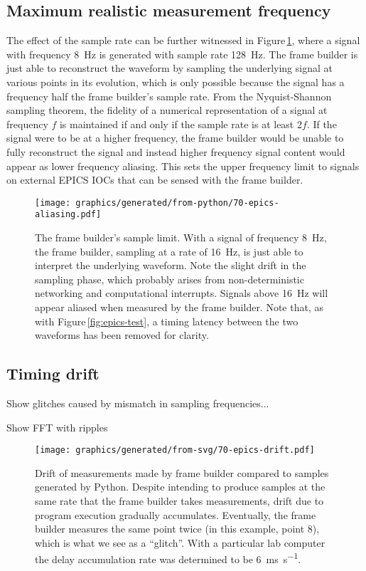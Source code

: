 \subsection{Maximum realistic measurement frequency}
The effect of the sample rate can be further witnessed in Figure\,\ref{fig:sample-aliasing}, where a signal with frequency \SI{8}{\hertz} is generated with sample rate \SI{128}{\hertz}. The frame builder is just able to reconstruct the waveform by sampling the underlying signal at various points in its evolution, which is only possible because the signal has a frequency half the frame builder's sample rate. From the Nyquist-Shannon sampling theorem, the fidelity of a numerical representation of a signal at frequency $f$ is maintained if and only if the sample rate is at least $2f$. If the signal were to be at a higher frequency, the frame builder would be unable to fully reconstruct the signal and instead higher frequency signal content would appear as lower frequency aliasing. This sets the upper frequency limit to signals on external \gls{EPICS} \glspl{IOC} that can be sensed with the frame builder.

\begin{figure}
  \centering
  \texttt{[image: graphics/generated/from-python/70-epics-aliasing.pdf]}
  \caption[Signal aliasing in the frame builder]{\label{fig:sample-aliasing}The frame builder's sample limit. With a signal of frequency \SI{8}{\hertz}, the frame builder, sampling at a rate of \SI{16}{\hertz}, is just able to interpret the underlying waveform. Note the slight drift in the sampling phase, which probably arises from non-deterministic networking and computational interrupts. Signals above \SI{16}{\hertz} will appear aliased when measured by the frame builder. Note that, as with Figure\,\ref{fig:epics-test}, a timing latency between the two waveforms has been removed for clarity.}
\end{figure}

\subsection{Timing drift}
Show glitches caused by mismatch in sampling frequencies...

Show FFT with ripples

\begin{figure}
  \centering
  \texttt{[image: graphics/generated/from-svg/70-epics-drift.pdf]}
  \caption[Drift of measurements made by frame builder compared to samples generated by Python]{\label{fig:epics-drift}Drift of measurements made by frame builder compared to samples generated by Python. Despite intending to produce samples at the same rate that the frame builder takes measurements, drift due to program execution gradually accumulates. Eventually, the frame builder measures the same point twice (in this example, point 8), which is what we see as a ``glitch''. With a particular lab computer the delay accumulation rate was determined to be \SI{6}{\milli\second\per\second}.}
\end{figure}

